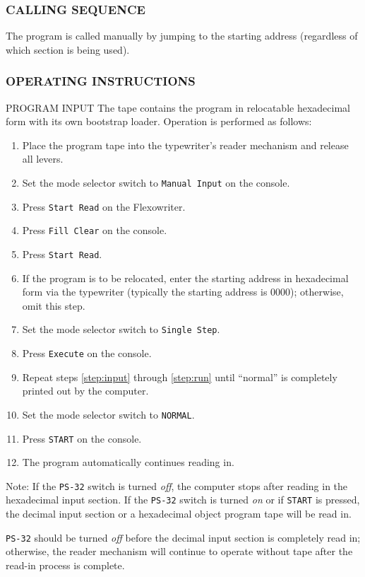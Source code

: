 \documentclass{article}
\begin{document}
\begin{enumerate}
\subsubsection*{CALLING SEQUENCE}
The program is called manually by jumping to the starting address (regardless of which section is being used).

\subsubsection*{OPERATING INSTRUCTIONS}

PROGRAM INPUT
The tape contains the program in relocatable hexadecimal form with its own bootstrap loader. Operation is performed as follows:

\begin{enumerate}[label=\alph*)]
\item Place the program tape into the typewriter's reader mechanism and release all levers.
\item \label{step:input} Set the mode selector switch to \texttt{Manual Input} on the console.
\item Press \texttt{Start Read} on the Flexowriter.
\item Press \texttt{Fill Clear} on the console.
\item Press \texttt{Start Read}.
\item If the program is to be relocated, enter the starting address in hexadecimal form via the typewriter (typically the starting address is $0000$); otherwise, omit this step.
\item Set the mode selector switch to \texttt{Single Step}.
\item \label{step:run} Press \texttt{Execute} on the console.
\item Repeat steps \ref{step:input} through \ref{step:run} until ``normal'' is completely printed out by the computer.
\item Set the mode selector switch to \texttt{NORMAL}.
\item Press \texttt{START} on the console.
\item The program automatically continues reading in.
\end{enumerate}
Note: If the \texttt{PS-32} switch is turned \emph{off}, the computer stops after reading in the hexadecimal input section. If the \texttt{PS-32} switch is turned \emph{on} or if \texttt{START} is pressed, the decimal input section or a hexadecimal object program tape will be read in.

\texttt{PS-32} should be turned \emph{off} before the decimal input section is completely read in; otherwise, the reader mechanism will continue to operate without tape after the read-in process is complete.


\end{enumerate}
\end{document}
